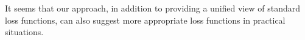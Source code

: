 \documentclass[twoside]{article}
\theoremstyle{plain}
\theoremstyle{definition}
\begin{document}
It seems that our approach, in addition to providing a unified view of standard loss functions, can also suggest more appropriate loss functions in practical situations.

\end{document}
